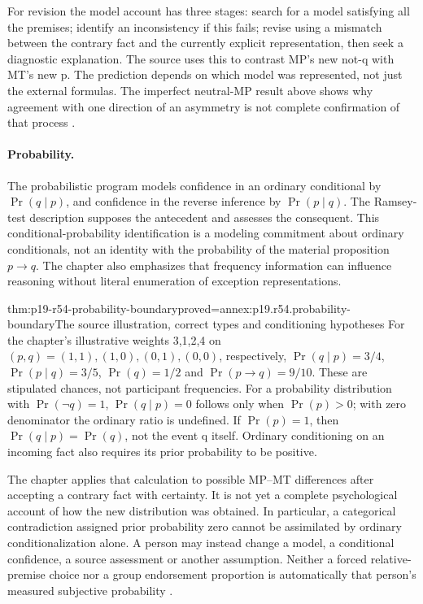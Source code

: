 For revision the model account has three stages: search for a model
satisfying all the premises; identify an inconsistency if this fails;
revise using a mismatch between the contrary fact and the currently
explicit representation, then seek a diagnostic explanation. The source
uses this to contrast MP's new not-q with MT's new p. The prediction
depends on which model was represented, not just the external formulas.
The imperfect neutral-MP result above shows why agreement with one
direction of an asymmetry is not complete confirmation of that process
\cite[\S4.1]{GazzoCastanedaKnauff2021Defeasible}.

\paragraph{Probability.}
The probabilistic program models confidence in an ordinary conditional
by \(\Pr(q\mid p)\), and confidence in the reverse inference by
\(\Pr(p\mid q)\). The Ramsey-test description supposes the antecedent
and assesses the consequent. This conditional-probability identification
is a modeling commitment about ordinary conditionals, not an identity
with the probability of the material proposition \(p\to q\).
The chapter also emphasizes that frequency information can influence
reasoning without literal enumeration of exception representations.

\begin{hbtheorem}{thm:p19-r54-probability-boundary}{proved=annex:p19.r54.probability-boundary}{The source illustration, correct types and conditioning hypotheses}
For the chapter's illustrative weights 3,1,2,4 on
\((p,q)=(1,1),(1,0),(0,1),(0,0)\), respectively,
\(\Pr(q\mid p)=3/4\), \(\Pr(p\mid q)=3/5\),
\(\Pr(q)=1/2\) and \(\Pr(p\to q)=9/10\).
These are stipulated chances, not participant frequencies.
For a probability distribution with \(\Pr(\neg q)=1\),
\(\Pr(q\mid p)=0\) follows only when \(\Pr(p)>0\);
with zero denominator the ordinary ratio is undefined.
If \(\Pr(p)=1\), then \(\Pr(q\mid p)=\Pr(q)\),
not the event q itself. Ordinary conditioning on an incoming fact
also requires its prior probability to be positive.
\end{hbtheorem}

The chapter applies that calculation to possible MP--MT differences
after accepting a contrary fact with certainty. It is not yet a complete
psychological account of how the new distribution was obtained. In
particular, a categorical contradiction assigned prior probability zero
cannot be assimilated by ordinary conditionalization alone. A person
may instead change a model, a conditional confidence, a source assessment
or another assumption. Neither a forced relative-premise choice nor a
group endorsement proportion is automatically that person's measured
subjective probability \cite[\S4.2]{GazzoCastanedaKnauff2021Defeasible}.

